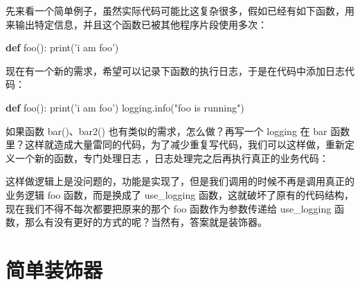 \documentclass[]{ctexbook}
\newenvironment{Shaded}{\begin{snugshade}}{\end{snugshade}}
\newcommand{\BuiltInTok}[1]{#1}
\newcommand{\KeywordTok}[1]{\textcolor[rgb]{0.13,0.29,0.53}{\textbf{#1}}}
\newcommand{\NormalTok}[1]{#1}
\newcommand{\OperatorTok}[1]{\textcolor[rgb]{0.81,0.36,0.00}{\textbf{#1}}}
\newcommand{\SpecialCharTok}[1]{\textcolor[rgb]{0.00,0.00,0.00}{#1}}
\newcommand{\StringTok}[1]{\textcolor[rgb]{0.31,0.60,0.02}{#1}}
\newcommand{\VariableTok}[1]{\textcolor[rgb]{0.00,0.00,0.00}{#1}}
\begin{document}
先来看一个简单例子，虽然实际代码可能比这复杂很多，假如已经有如下函数，用来输出特定信息，并且这个函数已被其他程序片段使用多次：

\begin{Shaded}
\begin{Highlighting}[]
\KeywordTok{def}\NormalTok{ foo():}
    \BuiltInTok{print}\NormalTok{(}\StringTok{'i am foo'}\NormalTok{)}
\end{Highlighting}
\end{Shaded}

现在有一个新的需求，希望可以记录下函数的执行日志，于是在代码中添加日志代码：

\begin{Shaded}
\begin{Highlighting}[]
\KeywordTok{def}\NormalTok{ foo():}
    \BuiltInTok{print}\NormalTok{(}\StringTok{'i am foo'}\NormalTok{)}
\NormalTok{    logging.info(}\StringTok{"foo is running"}\NormalTok{)}
\end{Highlighting}
\end{Shaded}

如果函数 bar()、bar2() 也有类似的需求，怎么做？再写一个 logging 在 bar 函数里？这样就造成大量雷同的代码，为了减少重复写代码，我们可以这样做，重新定义一个新的函数，专门处理日志 ，日志处理完之后再执行真正的业务代码：

\begin{Shaded}
\end{Shaded}

这样做逻辑上是没问题的，功能是实现了，但是我们调用的时候不再是调用真正的业务逻辑 foo 函数，而是换成了 use\_logging 函数，这就破坏了原有的代码结构，现在我们不得不每次都要把原来的那个 foo 函数作为参数传递给 use\_logging 函数，那么有没有更好的方式的呢？当然有，答案就是装饰器。

\hypertarget{ux7b80ux5355ux88c5ux9970ux5668}{%
\section{简单装饰器}\label{ux7b80ux5355ux88c5ux9970ux5668}}
\end{document}
